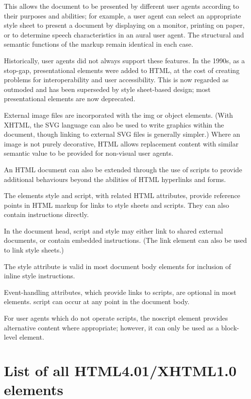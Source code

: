 This allows the document to be presented by different user agents according to their purposes and abilities; for example, a user agent can select an appropriate style sheet to present a document by displaying on a monitor, printing on paper, or to determine speech characteristics in an aural user agent. The structural and semantic functions of the markup remain identical in each case.

Historically, user agents did not always support these features. In the 1990s, as a stop-gap, presentational elements were added to HTML, at the cost of creating problems for interoperability and user accessibility. This is now regarded as outmoded and has been superseded by style sheet-based design; most presentational elements are now deprecated.

External image files are incorporated with the img or object elements. (With XHTML, the SVG language can also be used to write graphics within the document, though linking to external SVG files is generally simpler.) Where an image is not purely decorative, HTML allows replacement content with similar semantic value to be provided for non-visual user agents.


An HTML document can also be extended through the use of scripts to provide additional behaviours beyond the abilities of HTML hyperlinks and forms.

The elements style and script, with related HTML attributes, provide reference points in HTML markup for links to style sheets and scripts. They can also contain instructions directly.

\begin{compactitem}
\item In the document head, script and style may either link to shared external documents, or contain embedded instructions. (The link element can also be used to link style sheets.)
\item The style attribute is valid in most document body elements for inclusion of inline style instructions.
\item Event-handling attributes, which provide links to scripts, are optional in most elements.
script can occur at any point in the document body.
\item For user agents which do not operate scripts, the noscript element provides alternative content where appropriate; however, it can only be used as a block-level element.
\end{compactitem}


\section{List of all HTML4.01/XHTML1.0 elements}


